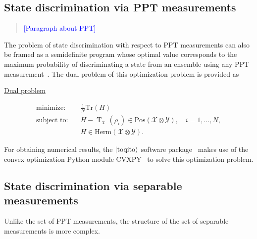 \documentclass[11pt]{article}
\theoremstyle{definition}
\newcommand{\comment}[1]{\begin{quote}\sf 
    \textcolor{blue}{[#1]}\end{quote}}
\newcommand{\microspace}{\mspace{0.5mu}}
\newcommand{\pt}{\operatorname{T}}
\newcommand{\ket}[1]{
  \lvert\microspace #1 \microspace \rangle}
\newcommand{\setft}[1]{\mathrm{#1}}
\newcommand{\Pos}{\setft{Pos}}
\newcommand{\X}{\mathcal{X}}
\newcommand{\Y}{\mathcal{Y}}
\begin{document}
\subsection*{State discrimination via PPT measurements}
\label{sec:state-discrimination-ppt}

\comment{Paragraph about PPT}

The problem of state discrimination with respect to PPT measurements can also
be framed as a semidefinite program whose optimal value corresponds to the
maximum probability of discriminating a state from an ensemble using any PPT
measurement~\cite{cosentino2013positive}. The dual problem of this optimization
problem is provided as
\begin{center}
  \begin{minipage}{5in}
    \centerline{\underline{Dual problem}}\vspace{-4mm}
    \begin{equation} \label{eq:ppt-dual}
	    \begin{aligned}
    		\text{minimize:} \quad & \frac{1}{N} \text{Tr}(H) \\
            \text{subject to:} \quad & H - \pt_{\X}
                               (\rho_i) \in \Pos(\X \otimes \Y), \quad i = 1,
                               \ldots, N, \\
                              & H \in \text{Herm}(\X \otimes \Y).
    \end{aligned}
    \end{equation}
  \end{minipage}
\end{center}
For obtaining numerical results, the $\ket{\text{toqito}}$ software
package~\cite{russo2020toqito} makes use of the convex optimization Python
module CVXPY~\cite{diamond2016cvxpy} to solve this optimization problem. 

\subsection*{State discrimination via separable measurements}
\label{sec:state-discrimination-separable}

Unlike the set of PPT measurements, the structure of the set of separable
measurements is more complex. 
\end{document}
